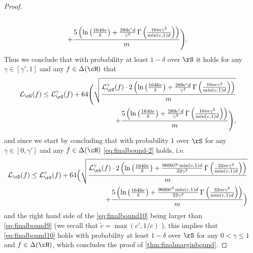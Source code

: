 \begin{proof}
\begin{align*}
        \\
        +\frac{5\left( \ln{\left(\frac{1640e}{\delta} \right)}+\frac{289c'd}{ \gamma^{2}} \operatorname{\Gamma}{\left(  \frac{16 m\gamma^{2} }{\min(c,1)d} \right)} \right)}{m}\Bigg).
      \end{align*}
      Thus we conclude that with probability at least $ 1-\delta $ over $ \rS $ it holds for any $ \gamma\in[\gamma',1] $ and any $ f\in \dlh $ that 
      \begin{align}\label{eq:finalbound9}
        \ls_{\cD}(f) 
        \leq
        \ls_{\rS}^{\gamma}(f)
        + \cc\Bigg(\sqrt{\frac{\ls_{\rS}^{\gamma}(f)\cdot 2 \left(\ln{\left(\frac{1640e}{\delta} \right)}+\frac{289c'd}{ \gamma^{2}} \func{\left(  \frac{16 m\gamma^{2} }{\min(c,1)d} \right)} \right)}{m}}
        \\
        +\frac{5\left( \ln{\left(\frac{1640e}{\delta} \right)}+\frac{289c'd}{ \gamma^{2}} \func{\left(  \frac{16 m\gamma^{2} }{\min(c,1)d} \right)} \right)}{m}\Bigg),
      \end{align}
      and since we start by concluding that with probability $ 1 $ over $ \rS $ for any  $ \gamma\in[0,\gamma']$ and any $ f\in\dlh $ \cref{eq:finalbound-2} holds, i.e. 
      \begin{align}\label{eq:finalbound10}
        \ls_{\cD}(f)
        \leq
        \ls_{\rS}^{\gamma}(f)
        + \cc\Big(\sqrt{\frac{\ls_{\rS}^{\gamma}(f)\cdot 2 \left(\ln{\left(\frac{1640e}{\delta} \right)}+\frac{9600\tilde{c}^2 \min(c,1)d}{32\gamma^{2}} \func{\left(  \frac{32 m\gamma^{2} }{\min(c,1)d} \right)} \right)}{m}}
        \\
        +\frac{5\left(\ln{\left(\frac{1640e}{\delta} \right)}+\frac{9600\tilde{c}^2 \min(c,1)d}{32\gamma^{2}} \func{\left(  \frac{32 m\gamma^{2} }{\min(c,1)d} \right)}\right)}{m}\Big)\nonumber
    \end{align}
    and the right hand side of the \cref{eq:finalbound10} being larger than \cref{eq:finalbound9} (we recall that $ \tilde{c}=\max(c',1/c) $ ), this implies that \cref{eq:finalbound10} holds with probability at least $ 1-\delta $ over $ \rS $ for any $ 0<\gamma\leq 1 $ and $f\in \dlh $, which concludes the proof of \cref{thm:finalmarginbound}. 
\end{proof}
